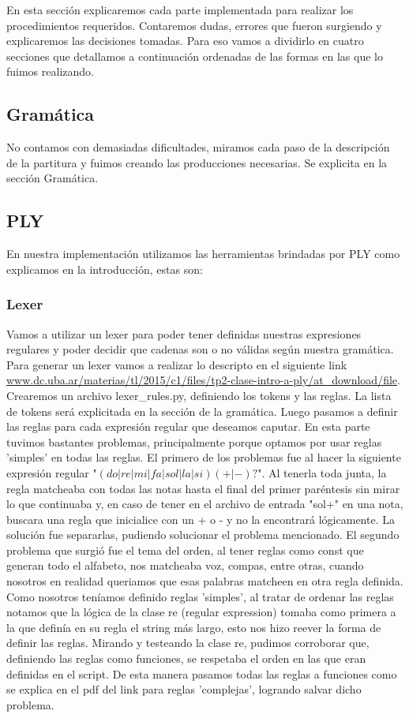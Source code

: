 En esta sección explicaremos cada parte implementada para realizar los procedimientos requeridos. Contaremos dudas, errores que fueron surgiendo y explicaremos las decisiones tomadas. Para eso vamos a dividirlo en cuatro secciones que detallamos a continuación ordenadas de las formas en las que lo fuimos realizando.

\subsection{Gramática}
No contamos con demasiadas dificultades, miramos cada paso de la descripción de la partitura y fuimos creando las producciones necesarias. Se explicita en la sección Gramática.

\subsection{PLY}
En nuestra implementación utilizamos las herramientas brindadas por PLY como explicamos en la introducción, estas son:
\subsubsection{Lexer}
Vamos a utilizar un lexer para poder tener definidas nuestras expresiones regulares y poder decidir que cadenas son o no válidas según nuestra gramática.
Para generar un lexer vamos a realizar lo descripto en el siguiente link \url{www.dc.uba.ar/materias/tl/2015/c1/files/tp2-clase-intro-a-ply/at_download/file}.
Crearemos un archivo lexer\_rules.py, definiendo los tokens y las reglas.
La lista de tokens será explicitada en la sección de la gramática.\newline
Luego pasamos a definir las reglas para cada expresión regular que deseamos caputar. En esta parte tuvimos bastantes problemas, principalmente porque optamos por usar reglas 'simples' en todas las reglas.\newline
El primero de los problemas fue al hacer la siguiente expresión regular "$(do|re|mi|fa|sol|la|si)(+|-)?$". Al tenerla toda junta, la regla matcheaba con todas las notas hasta el final del primer paréntesis sin mirar lo que continuaba y, en caso de tener en el archivo de entrada "sol+" en una nota, buscara una regla que inicialice con un + o - y no la encontrará lógicamente. La solución fue separarlas, pudiendo solucionar el problema mencionado. \newline
El segundo problema que surgió fue el tema del orden, al tener reglas como const que generan todo el alfabeto, nos matcheaba voz, compas, entre otras, cuando nosotros en realidad queriamos que esas palabras matcheen en otra regla definida. Como nosotros teníamos definido reglas 'simples', al tratar de ordenar las reglas notamos que la lógica de la clase re (regular expression) tomaba como primera a la que definía en su regla el string más largo, esto nos hizo reever la forma de definir las reglas. Mirando y testeando la clase re, pudimos corroborar que, definiendo las reglas como funciones, se respetaba el orden en las que eran definidas en el script. De esta manera pasamos todas las reglas a funciones como se explica en el pdf del link para reglas 'complejas', logrando salvar dicho problema.
